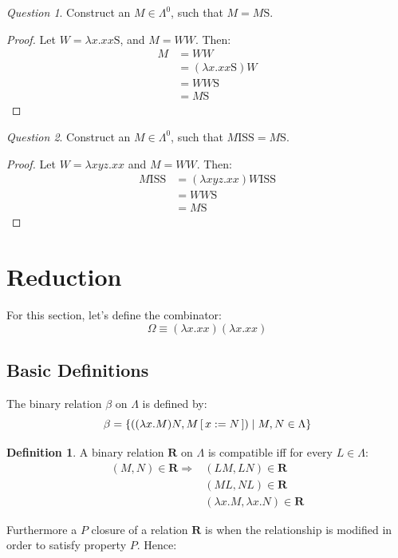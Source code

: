 \documentclass[11pt]{article}
\theoremstyle{definition}
\newtheorem{definition}{Definition}[section]
\theoremstyle{remark}
\theoremstyle{remark}
\newtheorem{question}{Question}
\theoremstyle{definition}
\renewcommand{\S}{\pmb{\mathrm{S}}}
\newcommand{\I}{\pmb{\mathrm{I}}}
\begin{document}
\begin{question}
  Construct an $M \in \Lambda^0$, such that $M = M\S$.
\end{question}
\begin{proof}
  Let $W = \lambda x. xx\S$, and $M = WW$. Then:
  \begin{align*}
    M &= WW \\
      &= (\lambda x. xx\S)W \\
      &= WW\S \\
      &= M\S
  \end{align*}
\end{proof}

\begin{question}
  Construct an $M \in \Lambda^0$, such that $M\I\S\S = M\S$.
\end{question}
\begin{proof}
  Let $W = \lambda xyz.xx$ and $M = WW$. Then:
  \begin{align*}
    M\I\S\S &= (\lambda xyz. xx)W\I\S\S \\
            &= WW\S \\
            &= M\S
  \end{align*}
\end{proof}

\newpage
\section{Reduction}
For this section, let's define the combinator:
%
\begin{equation*}
  \Omega \equiv (\lambda x. xx)(\lambda x. xx)
\end{equation*}

\subsection{Basic Definitions}
The binary relation $\beta$ on $\Lambda$ is defined by:
\begin{equation*}
  \beta = \{((\lambda x.M)N, M\cx[x := N]) \mid M, N \in \Lambda\}
\end{equation*}

\begin{definition}
  A binary relation $\pmb{R}$ on $\Lambda$ is compatible iff for every
  $L \in \Lambda$:
  \begin{align*}
    (M, N) \in \pmb{R} \Rightarrow& (LM, LN) \in \pmb{R} \\
                                  &(ML, NL) \in \pmb{R} \\
                                  &(\lambda x.M, \lambda x.N) \in \pmb{R}
  \end{align*}
\end{definition}
Furthermore a $P$ closure of a relation $\pmb{R}$ is when the relationship is
modified in order to satisfy property $P$. Hence:
\end{document}
